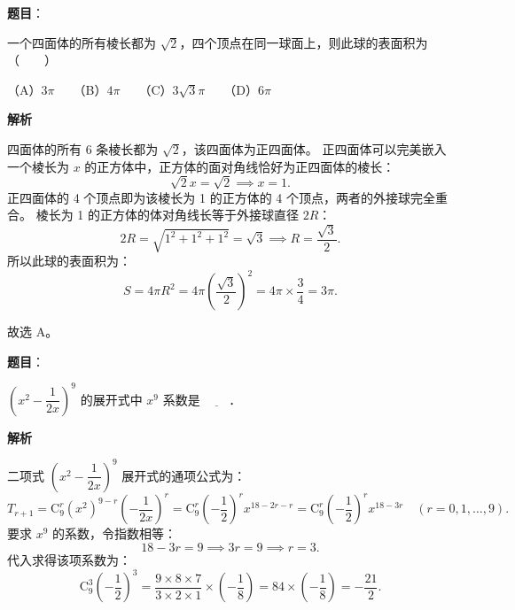 \begin{answer}

\textbf{题目}：

一个四面体的所有棱长都为 $\sqrt{2}$，四个顶点在同一球面上，则此球的表面积为\mbox{（　　）}

（A）$3\pi$　　（B）$4\pi$　　（C）$3\sqrt{3}\pi$　　（D）$6\pi$

\textbf{解析}

四面体的所有 6 条棱长都为 $\sqrt{2}$，该四面体为正四面体。
正四面体可以完美嵌入一个棱长为 $x$ 的正方体中，正方体的面对角线恰好为正四面体的棱长：
\nopagebreak[4]
\[\sqrt{2} x = \sqrt{2} \implies x = 1.\]
正四面体的 4 个顶点即为该棱长为 1 的正方体的 4 个顶点，两者的外接球完全重合。
棱长为 1 的正方体的体对角线长等于外接球直径 $2R$：
\nopagebreak[4]
\[2R = \sqrt{1^2 + 1^2 + 1^2} = \sqrt{3} \implies R = \frac{\sqrt{3}}{2}.\]
所以此球的表面积为：
\nopagebreak[4]
\[S = 4\pi R^2 = 4\pi \left(\frac{\sqrt{3}}{2}\right)^2 = 4\pi \times \frac{3}{4} = 3\pi.\]

故选 A。


\end{answer}
\begin{answer}

\textbf{题目}：

$\left(x^2 - \dfrac{1}{2x}\right)^9$ 的展开式中 $x^9$ 系数是 $\underline{\hspace{2em}}$．

\textbf{解析}

二项式 $\left(x^2 - \dfrac{1}{2x}\right)^9$ 展开式的通项公式为：
\nopagebreak[4]
\[T_{r+1} = \mathrm{C}_9^r (x^2)^{9-r} \left(-\frac{1}{2x}\right)^r = \mathrm{C}_9^r \left(-\frac{1}{2}\right)^r x^{18 - 2r - r} = \mathrm{C}_9^r \left(-\frac{1}{2}\right)^r x^{18 - 3r} \quad (r = 0, 1, \dots, 9).\]
要求 $x^9$ 的系数，令指数相等：
\nopagebreak[4]
\[18 - 3r = 9 \implies 3r = 9 \implies r = 3.\]
代入求得该项系数为：
\nopagebreak[4]
\[\mathrm{C}_9^3 \left(-\frac{1}{2}\right)^3 = \frac{9 \times 8 \times 7}{3 \times 2 \times 1} \times \left(-\frac{1}{8}\right) = 84 \times \left(-\frac{1}{8}\right) = -\frac{21}{2}.\]


\end{answer}
